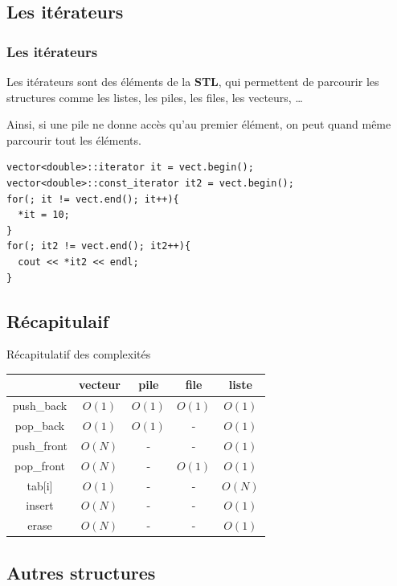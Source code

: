\subsection{Les itérateurs}

\begin{frame}[fragile]
\frametitle{Les itérateurs}
Les itérateurs sont des éléments de la \textbf{STL}, qui permettent de parcourir les structures comme les listes, les piles, les files, les vecteurs, \dots

Ainsi, si une pile ne donne accès qu'au premier élément, on peut quand même parcourir tout les éléments.

\begin{verbatim}
vector<double>::iterator it = vect.begin();
vector<double>::const_iterator it2 = vect.begin();
for(; it != vect.end(); it++){
  *it = 10;
}
for(; it2 != vect.end(); it2++){
  cout << *it2 << endl;
}
\end{verbatim}
\end{frame}

\subsection{Récapitulaif}

\begin{frame}{Récapitulatif des complexités}
\begin{center}
\begin{tabular}{ c | c | c | c | c }
& vecteur & pile & file & liste\\
\hline
push\_back & $O(1)$ & $O(1)$ & $O(1)$ & $O(1)$\\
\hline
pop\_back & $O(1)$ & $O(1)$ & - & $O(1)$\\
\hline
push\_front & $O(N)$ & - & - & $O(1)$\\
\hline
pop\_front & $O(N)$ & - & $O(1)$ & $O(1)$\\
\hline
tab[i] & $O(1)$ & - & - & $O(N)$\\
\hline
insert & $O(N)$ & - & - & $O(1)$\\
\hline
erase & $O(N)$ & - & - & $O(1)$\\
\hline
\end{tabular}
\end{center}
\end{frame}

\subsection{Autres structures}

